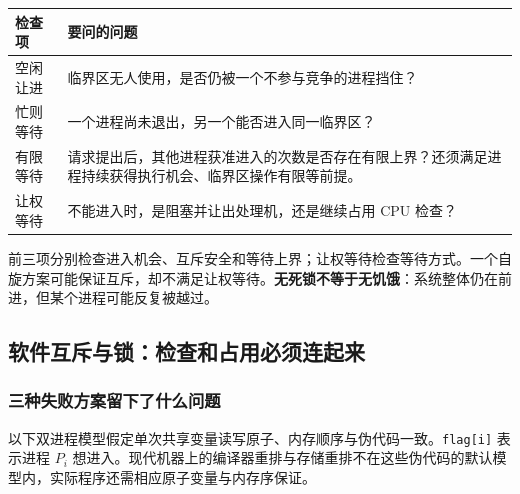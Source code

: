 \begin{wideblock}

\par\medskip\noindent\begin{minipage}{\linewidth}\fontsize{9.3}{12}\selectfont\begin{tabularx}{\linewidth}{@{}YY@{}}
\toprule\noalign{}
\begin{minipage}[b]{\linewidth}\raggedright
检查项
\end{minipage} & \begin{minipage}[b]{\linewidth}\raggedright
要问的问题
\end{minipage} \\
\midrule\noalign{}


空闲让进 & 临界区无人使用，是否仍被一个不参与竞争的进程挡住？ \\
忙则等待 & 一个进程尚未退出，另一个能否进入同一临界区？ \\
有限等待 & 请求提出后，其他进程获准进入的次数是否存在有限上界？还须满足进程持续获得执行机会、临界区操作有限等前提。 \\
让权等待 & 不能进入时，是阻塞并让出处理机，还是继续占用 CPU 检查？ \\
\bottomrule\end{tabularx}
\end{minipage}\par\medskip

\end{wideblock}

前三项分别检查进入机会、互斥安全和等待上界；让权等待检查等待方式。一个自旋方案可能保证互斥，却不满足让权等待。\textbf{无死锁不等于无饥饿}：系统整体仍在前进，但某个进程可能反复被越过。

\subsection{软件互斥与锁：检查和占用必须连起来}\label{OS02-locks}

\subsubsection{三种失败方案留下了什么问题}\label{OS02-auto-9}

以下双进程模型假定单次共享变量读写原子、内存顺序与伪代码一致。\texttt{flag[i]} 表示进程 \(P_i\) 想进入。现代机器上的编译器重排与存储重排不在这些伪代码的默认模型内，实际程序还需相应原子变量与内存序保证。

